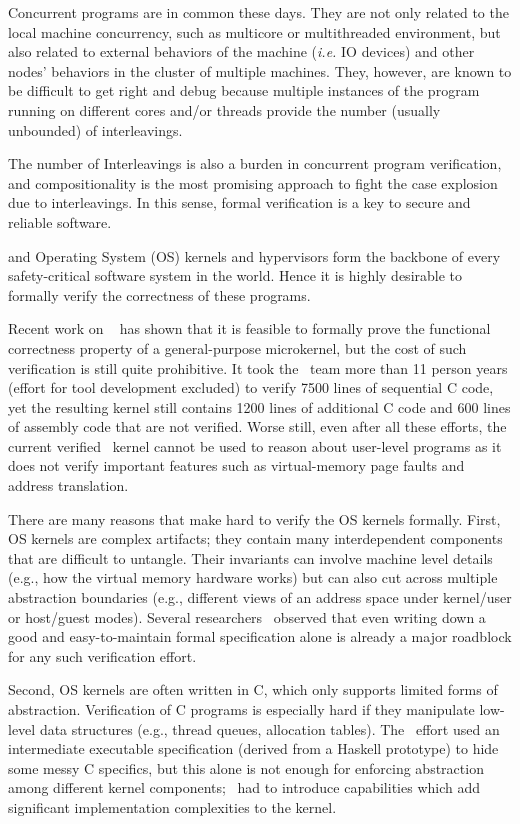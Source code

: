 Concurrent programs are in common these days.
They are not only related to the local machine concurrency, such as multicore or multithreaded environment, 
but also  related to external behaviors of the machine (\textit{i.e.} IO devices) and other nodes' behaviors in the cluster of multiple machines. 
 They, however, are known to be difficult to get right 
and debug 
because multiple instances of 
the program running on different cores and/or threads 
provide the number (usually unbounded) of interleavings. 

The number of Interleavings is also a burden in
concurrent program verification,
and 
compositionality is the most promising approach to fight 
the case explosion due to interleavings.
In this sense, formal verification is a key to secure and reliable software. 


and  Operating System (OS) kernels and hypervisors form the backbone of every safety-critical software system in the world. 
Hence it is highly desirable to formally verify the correctness of these programs.

Recent work on \selfour~\cite{klein2009sel4,klein14} has shown that it is feasible to formally prove the functional correctness property of a general-purpose microkernel, but the cost of such verification is still quite prohibitive. 
It took the \selfour\ team more than 11 person years (effort for tool development excluded) to verify 7500 lines of sequential C code, yet the resulting kernel still contains 1200 lines of additional C code and 600 lines of assembly code that are not verified. 
Worse still, even after all these efforts, the current verified \selfour\ kernel cannot be used to reason about user-level programs as it does not verify important features such as virtual-memory page faults and address translation.

There are many reasons that make hard to verify the OS kernels formally.
First, OS kernels are complex artifacts; they contain many interdependent components that are difficult to untangle.
Their invariants can involve machine level details (e.g., how the virtual memory hardware works) but can also cut across multiple abstraction boundaries (e.g., different views of an address space under kernel/user or host/guest modes).
Several researchers~\cite{baumann12,vaynberg12} observed that even writing down a good and easy-to-maintain formal specification alone is already a major roadblock for any such verification effort.

Second, OS kernels are often written in C, which only supports limited forms of abstraction.  Verification of C programs is especially hard if they manipulate low-level data structures (e.g., thread queues, allocation tables).  
The \selfour\ effort used an intermediate executable specification (derived from a Haskell prototype) to hide some messy C specifics, but this alone is not enough for enforcing abstraction among different kernel components; \selfour\ had to introduce capabilities which add significant implementation complexities to the kernel.

